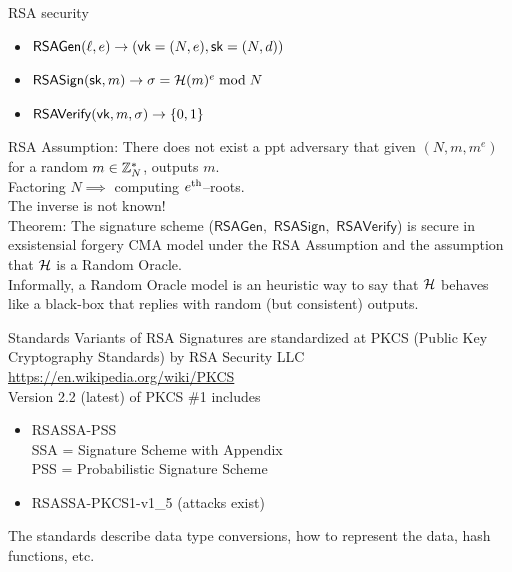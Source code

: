 \documentclass[usenames,dvipsnames, 9pt]{beamer}
\begin{document}
\begin{frame}{RSA security}
\Large
\begin{itemize}
	\item $\mathsf{RSAGen}(\ell, e) \rightarrow (\textsf{vk} = (N, e), \textsf{sk}=(N, d))$
	\item $\mathsf{RSASign}(\textsf{sk}, m) \rightarrow \sigma = \mathcal{H}(m)^e \bmod N$
	\item $\mathsf{RSAVerify}(\textsf{vk}, m, \sigma) \rightarrow \{0,1\}$
\end{itemize}

{\color{Orange}  RSA Assumption:}
There does not exist a ppt adversary that given $(N, m, m^e)$ for a random $m \in {{\mathbb Z}}_N^\ast$, outputs $m$.\\[10pt]
\pause
{\large Factoring $N \implies $ computing $e^{\mathrm{th}}$--roots. \\ The inverse is not known! }  \\[10pt]
\pause
{\color{Orange}  Theorem:} The signature scheme ($\mathsf{RSAGen},$ $\mathsf{RSASign},$ $\mathsf{RSAVerify}$) is secure in {\color{Orange}  exsistensial forgery CMA} model under {\color{Orange}  the RSA Assumption} and the assumption that $\mathcal{H}$ is a {\color{Orange}  Random Oracle}. \\[10pt]
\pause
Informally, {\color{Orange} a Random Oracle model} is an heuristic way to say that $\mathcal{H}$ behaves like a black-box that replies with random (but consistent) outputs.
 
\end{frame}

\begin{frame}{Standards}
\Large 
Variants of RSA Signatures are standardized at PKCS (Public Key Cryptography Standards)  by RSA Security LLC
\url{https://en.wikipedia.org/wiki/PKCS} \\[10pt]

Version 2.2 (latest) of PKCS \#1 includes \\[10pt]
\begin{itemize}
	\itemsep10pt
	\item RSASSA-PSS \\
	SSA = Signature Scheme with Appendix \\
	PSS =  Probabilistic Signature Scheme
	\item  RSASSA-PKCS1-v1\_5 (attacks exist)
\end{itemize}

The standards describe data type conversions, how to represent the data, hash functions, etc.

\end{frame}
\end{document}
